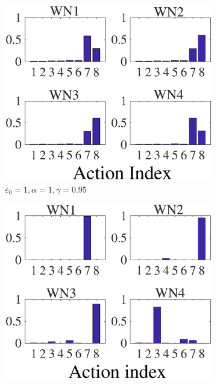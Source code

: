 \documentclass[conference]{IEEEtran}
\begin{document}
	\begin{figure}[h!]
		\centering
		\begin{subfigure}[b]{0.225\textwidth}
			\includegraphics[width=\textwidth]{images/e_1_a1_g095}
			\caption{$\varepsilon_0=1, \alpha=1, \gamma=0.95$}
			\label{fig:e_1_a1_g095}
		\end{subfigure}
		\begin{subfigure}[b]{0.225\textwidth}
			\includegraphics[width=\textwidth]{images/e_01_a_1_g_095}

\end{subfigure}
\end{figure}
\end{document}
